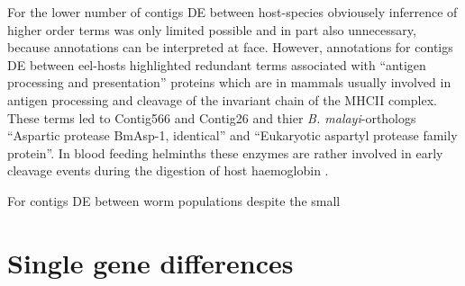 For the lower number of contigs DE between host-species obviousely
inferrence of higher order terms was only limited possible and in part
also unnecessary, because annotations can be interpreted at
face. However, annotations for contigs DE between eel-hosts
highlighted redundant terms associated with ``antigen processing and
presentation'' proteins which are in mammals usually involved in
antigen processing and cleavage of the invariant chain of the MHCII
complex. These terms led to Contig566 and Contig26 and thier
\textit{B. malayi}-orthologs ``Aspartic protease BmAsp-1, identical''
and ``Eukaryotic aspartyl protease family protein''. In blood feeding
helminths these enzymes are rather involved in early cleavage events
during the digestion of host haemoglobin \cite{pmid12782060}.

For contigs DE between worm populations despite the small 







\section{Single gene differences}
\label{sec:single-gene-diff}










